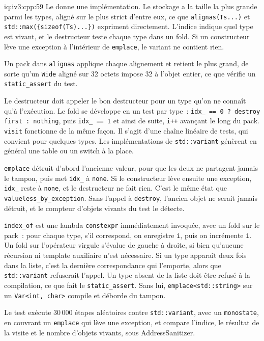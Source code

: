 \begin{solution}{iq:iv3:cpp:59}
Le  donne une implémentation. Le stockage a la taille la plus grande parmi les types, aligné sur le plus strict d'entre eux, ce que \texttt{alignas(Ts.{}.{}.)} et \texttt{std::max(\{sizeof(Ts).{}.{}.\})} expriment directement. L'indice indique quel type est vivant, et le destructeur teste chaque type dans un fold. Si un constructeur lève une exception à l'intérieur de \texttt{emplace}, le variant ne contient rien.
\label{lst:iv3:cp:var}

Un pack dans \texttt{alignas} applique chaque alignement et retient le plus grand, de sorte qu'un \texttt{Wide} aligné sur 32 octets impose 32 à l'objet entier, ce que vérifie un \texttt{static\_assert} du test.

Le destructeur doit appeler le bon destructeur pour un type qu'on ne connaît qu'à l'exécution. Le fold se développe en un test par type~: \texttt{idx\_ == 0 ? destroy first : nothing}, puis \texttt{idx\_ == 1} et ainsi de suite, \texttt{i++} avançant le long du pack. \texttt{visit} fonctionne de la même façon. Il s'agit d'une chaîne linéaire de tests, qui convient pour quelques types. Les implémentations de \texttt{std::variant} génèrent en général une table ou un switch à la place.

\texttt{emplace} détruit d'abord l'ancienne valeur, pour que les deux ne partagent jamais le tampon, puis met \texttt{idx\_} à \texttt{none}. Si le constructeur lève ensuite une exception, \texttt{idx\_} reste à \texttt{none}, et le destructeur ne fait rien. C'est le même état que \texttt{valueless\_by\_exception}. Sans l'appel à \texttt{destroy}, l'ancien objet ne serait jamais détruit, et le compteur d'objets vivants du test le détecte.

\texttt{index\_of} est une lambda \texttt{constexpr} immédiatement invoquée, avec un fold sur le pack~: pour chaque type, s'il correspond, on enregistre \texttt{i}, puis on incrémente \texttt{i}. Un fold sur l'opérateur virgule s'évalue de gauche à droite, si bien qu'aucune récursion ni template auxiliaire n'est nécessaire. Si un type apparaît deux fois dans la liste, c'est la dernière correspondance qui l'emporte, alors que \texttt{std::variant} refuserait l'appel. Un type absent de la liste doit être refusé à la compilation, ce que fait le \texttt{static\_assert}. Sans lui, \texttt{emplace<std::string>} sur un \texttt{Var<int, char>} compile et déborde du tampon.

Le test exécute 30\,000 étapes aléatoires contre \texttt{std::variant}, avec un \texttt{monostate}, en couvrant un \texttt{emplace} qui lève une exception, et compare l'indice, le résultat de la visite et le nombre d'objets vivants, sous AddressSanitizer.

\end{solution}

